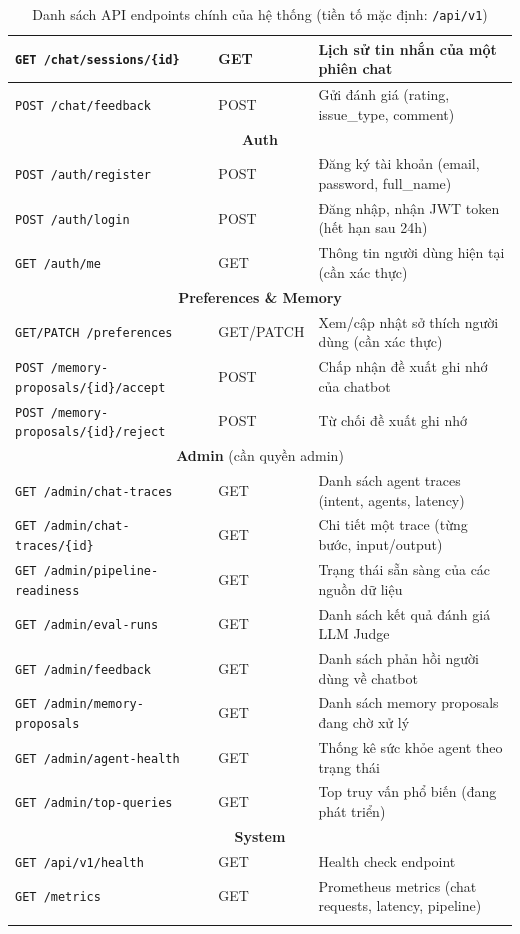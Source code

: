{\begin{longtable}{|p{5.2cm}|p{1.2cm}|p{9.3cm}|}
    \hline
    \texttt{GET /chat/sessions/\{id\}} & GET & Lịch sử tin nhắn của một phiên chat \\
    \hline
    \texttt{POST /chat/feedback} & POST & Gửi đánh giá (rating, issue\_type, comment) \\
    \hline
    \multicolumn{3}{|c|}{\textbf{Auth}} \\
    \hline
    \texttt{POST /auth/register} & POST & Đăng ký tài khoản (email, password, full\_name) \\
    \hline
    \texttt{POST /auth/login} & POST & Đăng nhập, nhận JWT token (hết hạn sau 24h) \\
    \hline
    \texttt{GET /auth/me} & GET & Thông tin người dùng hiện tại (cần xác thực) \\
    \hline
    \multicolumn{3}{|c|}{\textbf{Preferences \& Memory}} \\
    \hline
    \texttt{GET/PATCH /preferences} & GET/PATCH & Xem/cập nhật sở thích người dùng (cần xác thực) \\
    \hline
    \texttt{POST /memory-proposals/\{id\}/accept} & POST & Chấp nhận đề xuất ghi nhớ của chatbot \\
    \hline
    \texttt{POST /memory-proposals/\{id\}/reject} & POST & Từ chối đề xuất ghi nhớ \\
    \hline
    \multicolumn{3}{|c|}{\textbf{Admin} (cần quyền admin)} \\
    \hline
    \texttt{GET /admin/chat-traces} & GET & Danh sách agent traces (intent, agents, latency) \\
    \hline
    \texttt{GET /admin/chat-traces/\{id\}} & GET & Chi tiết một trace (từng bước, input/output) \\
    \hline
    \texttt{GET /admin/pipeline-readiness} & GET & Trạng thái sẵn sàng của các nguồn dữ liệu \\
    \hline
    \texttt{GET /admin/eval-runs} & GET & Danh sách kết quả đánh giá LLM Judge \\
    \hline
    \texttt{GET /admin/feedback} & GET & Danh sách phản hồi người dùng về chatbot \\
    \hline
    \texttt{GET /admin/memory-proposals} & GET & Danh sách memory proposals đang chờ xử lý \\
    \hline
    \texttt{GET /admin/agent-health} & GET & Thống kê sức khỏe agent theo trạng thái \\
    \hline
    \texttt{GET /admin/top-queries} & GET & Top truy vấn phổ biến (đang phát triển) \\
    \hline
    \multicolumn{3}{|c|}{\textbf{System}} \\
    \hline
    \texttt{GET /api/v1/health} & GET & Health check endpoint \\
    \hline
    \texttt{GET /metrics} & GET & Prometheus metrics (chat requests, latency, pipeline) \\
    \hline
    \caption{Danh sách API endpoints chính của hệ thống (tiền tố mặc định: \texttt{/api/v1})}
    \label{tab:api-list}
\end{longtable}
}

